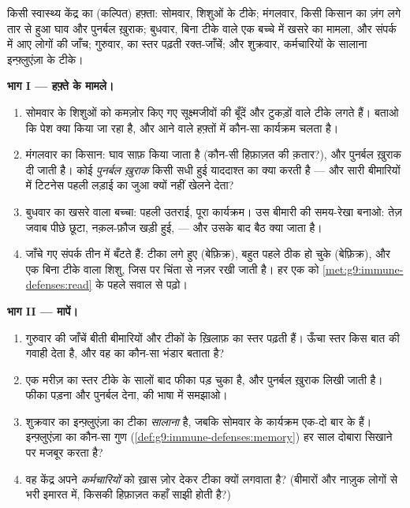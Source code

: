 \begin{problem}[{सप्ताहांत समस्या --- किसी स्वास्थ्य केंद्र का एक हफ़्ता,
प्रतिरक्षा वाले तरीक़े से पढ़ा हुआ}]\label{pb:g9:immune-defenses:1}
किसी स्वास्थ्य केंद्र का (कल्पित) हफ़्ता: सोमवार, शिशुओं के टीके;
मंगलवार, किसी किसान का ज़ंग लगे तार से हुआ घाव और पुनर्बल ख़ुराक; बुधवार,
बिना टीके वाले एक बच्चे में खसरे का मामला, और संपर्क में आए लोगों की
जाँच; गुरुवार,  का स्तर पढ़ती रक्त-जाँचें; और शुक्रवार,
कर्मचारियों के सालाना इन्फ़्लुएंज़ा के टीके।

\medskip\noindent\textbf{भाग I --- हफ़्ते के मामले।}
\begin{enumerate}
  \item सोमवार के शिशुओं को कमज़ोर किए गए सूक्ष्मजीवों की बूँदें और
        टुकड़ों वाले टीके लगते हैं। बताओ कि पेश क्या किया जा रहा है,
        और आने वाले हफ़्तों में कौन-सा कार्यक्रम चलता है।
  \item मंगलवार का किसान: घाव साफ़ किया जाता है (कौन-सी हिफ़ाज़त की
        क़तार?), और पुनर्बल ख़ुराक दी जाती है। कोई \emph{पुनर्बल
        ख़ुराक} किसी सधी हुई याददाश्त का क्या करती है --- और सारी
        बीमारियों में टिटनेस पहली लड़ाई का जुआ क्यों नहीं खेलने देता?
  \item बुधवार का खसरे वाला बच्चा: पहली उतराई, पूरा कार्यक्रम। उस
        बीमारी की समय-रेखा बनाओ: तेज़ जवाब पीछे छूटा, नक़ल-फ़ौज खड़ी
        हुई,  --- और उसके बाद बैठ क्या जाता है।
  \item जाँचे गए संपर्क तीन में बँटते हैं: टीका लगे हुए (बेफ़िक्र),
        बहुत पहले ठीक हो चुके (बेफ़िक्र), और एक बिना टीके वाला शिशु,
        जिस पर चिंता से नज़र रखी जाती है। हर एक को
        \cref{met:g9:immune-defenses:read} के पहले सवाल से पढ़ो।
\end{enumerate}

\medskip\noindent\textbf{भाग II --- मापें।}
\begin{enumerate}[resume]
  \item गुरुवार की जाँचें बीती बीमारियों और टीकों के ख़िलाफ़
         का स्तर पढ़ती हैं। ऊँचा स्तर किस बात की गवाही
        देता है, और वह  का कौन-सा भंडार बताता है?
  \item एक मरीज़ का स्तर टीके के सालों बाद फीका पड़ चुका है, और पुनर्बल
        ख़ुराक लिखी जाती है। फीका पड़ना और पुनर्बल देना,
         की भाषा में समझाओ।
  \item शुक्रवार का इन्फ़्लुएंज़ा का टीका \emph{सालाना} है, जबकि सोमवार
        के कार्यक्रम एक-दो बार के हैं। इन्फ़्लुएंज़ा  का कौन-सा गुण
        (\cref{def:g9:immune-defenses:memory}) हर साल दोबारा सिखाने पर
        मजबूर करता है?
  \item वह केंद्र अपने \emph{कर्मचारियों} को ख़ास ज़ोर देकर टीका क्यों
        लगवाता है? (बीमारों और नाज़ुक लोगों से भरी इमारत में, किसकी
        हिफ़ाज़त कहाँ साझी होती है?)
\end{enumerate}


\end{problem}

